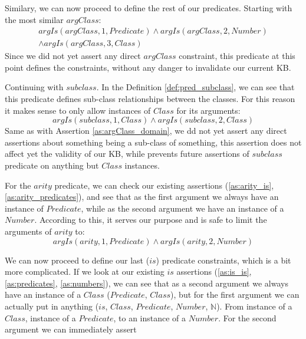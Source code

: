 Similary, we can now proceed to define the rest of our predicates. Starting with
the most similar $argClass$:
\begin{equation}\label{as:argClass_domain}
\begin{gathered}
	argIs(argClass,1,Predicate) \land argIs(argClass,2,Number) \\
	\land argIs(argClass,3,Class) 
\end{gathered}
\end{equation}
Since we did not yet assert any direct $argClass$ constraint, this predicate
at this point defines the constraints, without any danger to invalidate our
current KB. 

Continuing with $subclass$. In the Definition \ref{def:pred_subclass}, 
we can see that this
predicate defines sub-class relationships between the classes. For this reason
it makes sense to only allow instances of $Class$ for its arguments:
\begin{equation}\label{as:subclass_is_constraint}
	argIs(subclass,1,Class) \land argIs(subclass,2,Class)
\end{equation}
Same as with Assertion \ref{as:argClass_domain}, we dd not yet assert any 
direct assertions about something being a sub-class of something, this assertion
does not affect yet the validity of our KB, while prevents future assertions of 
$subclass$ predicate on anything but $Class$ instances.

For the $arity$ predicate, we can check our existing assertions 
(\ref{as:arity_is}, \ref{as:arity_predicates}), and
see that as the first argument we always have an instance of $Predicate$, while
as the second argument we have an instance of a $Number$. According to this, it
serves our purpose and is safe to limit the arguments of $arity$ to:
\begin{equation}\label{as:arity_is_constraint}
	argIs(arity,1,Predicate) \land argIs(arity,2,Number)
\end{equation}

We can now proceed to define our last ($is$) predicate constraints, which is
a bit more complicated. If we look at our existing  $is$ assertions 
(\ref{as:is_is}, \ref{as:predicates}, \ref{as:numbers}), we can
see that as a second argument we always have an instance of a $Class$ 
($Predicate$, $Class$), but
for the first argument we can actually put in anything ($is$, $Class$, 
$Predicate$,  $Number$, $\mathbb{N}$). From instance of a $Class$,
instance of a $Predicate$, to an instance of a $Number$. For the second argument
we can immediately assert

